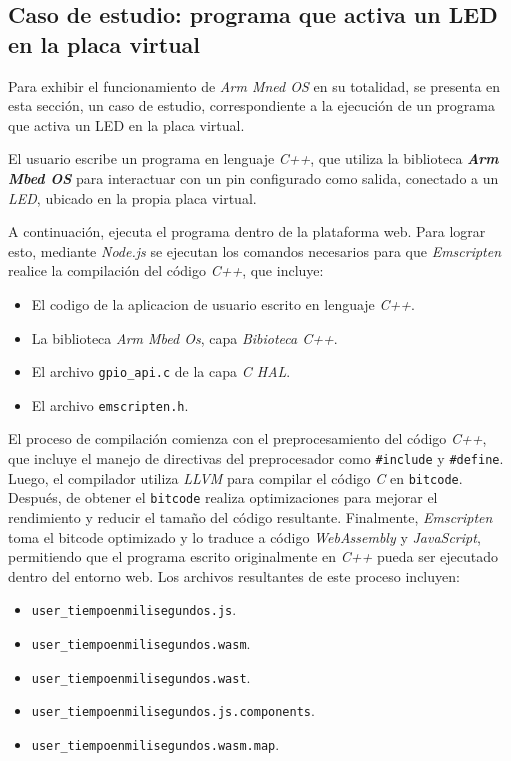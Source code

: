 \subsection{Caso de estudio: programa que activa un LED en la placa virtual}
\label{sec:caso_de_estudio}

Para exhibir el funcionamiento de \textit{Arm Mned OS} en su totalidad, se presenta en esta sección, un caso de estudio, correspondiente a la ejecución de un programa que activa un LED en la placa virtual.

El usuario escribe un programa en lenguaje \textit{C++}, que utiliza la biblioteca \textit{\textbf{Arm Mbed OS}} para interactuar con un pin configurado como salida, conectado a un \textit{LED}, ubicado en la propia placa virtual. 

A continuación, ejecuta el programa dentro de la plataforma web. Para lograr esto, mediante \textit{Node.js} se ejecutan los comandos necesarios para que \textit{Emscripten} realice la compilación del código \textit{C++}, que incluye: 

\begin{itemize}
    \item El codigo de la aplicacion de usuario escrito en lenguaje \textit{C++}.
    \item La biblioteca \textit{Arm Mbed Os}, capa \textit{Bibioteca C++}.
    \item El archivo \texttt{gpio\_api.c} de la capa \textit{C HAL}.
    \item El archivo \texttt{emscripten.h}.
\end{itemize} 

El proceso de compilación comienza con el preprocesamiento del código \textit{C++}, que incluye el manejo de directivas del preprocesador como \texttt{\#include} y \texttt{\#define}. Luego, el compilador utiliza \textit{LLVM} para compilar el código \textit{C} en \texttt{bitcode}. Después, de obtener el \texttt{bitcode} realiza optimizaciones para mejorar el rendimiento y reducir el tamaño del código resultante. Finalmente, \textit{Emscripten} toma el bitcode optimizado y lo traduce a código \textit{WebAssembly} y \textit{JavaScript}, permitiendo que el programa escrito originalmente en \textit{C++} pueda ser ejecutado dentro del entorno web. Los archivos resultantes de este proceso incluyen: 

\newpage

\begin{itemize}
    \item \texttt{user\_tiempoenmilisegundos.js}.
    \item \texttt{user\_tiempoenmilisegundos.wasm}.
    \item \texttt{user\_tiempoenmilisegundos.wast}.
    \item \texttt{user\_tiempoenmilisegundos.js.components}.
    \item \texttt{user\_tiempoenmilisegundos.wasm.map}.
\end{itemize}

